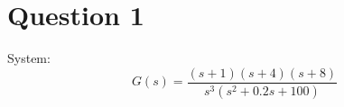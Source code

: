 \section{Question 1}
System:
$$
G(s) = \dfrac{(s + 1)  (s + 4)  (s + 8)}{s^3  (s^2 + 0.2  s + 100)}
$$